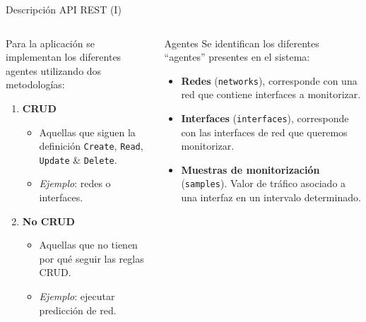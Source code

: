 \documentclass[aspectratio=169,xcolor=dvipsnames]{beamer}
\begin{document}
	\begin{frame}{Descripción API REST (I)}
		\begin{columns}
			\begin{column}{0.5\textwidth}
				Para la aplicación se implementan los diferentes agentes utilizando dos metodologías: \\
				
				\vspace{12px}
				
				\begin{enumerate}
					\item \textbf{CRUD} 
					\begin{itemize}
						\item Aquellas que siguen la definición \texttt{Create}, \texttt{Read}, \texttt{Update} \& \texttt{Delete}.
						
						\item \textit{Ejemplo}: redes o interfaces.
					\end{itemize}
				
					\item \textbf{No CRUD}
					\begin{itemize}
						\item Aquellas que no tienen por qué seguir las reglas CRUD.
						
						\item \textit{Ejemplo}: ejecutar predicción de red.
					\end{itemize}
				\end{enumerate}
			\end{column}
		
			\begin{column}{0.5\textwidth}
				\begin{alertblock}{Agentes}
					Se identifican los diferentes ``agentes'' presentes en el sistema:
					
					\begin{itemize}
						\item \textbf{Redes} (\texttt{networks}), corresponde con una red que contiene interfaces a monitorizar.
						
						\item \textbf{Interfaces} (\texttt{interfaces}), corresponde con las interfaces de red que queremos monitorizar.
						
						\item \textbf{Muestras de monitorización} (\texttt{samples}). Valor de tráfico asociado a una interfaz en un intervalo determinado.
					\end{itemize}
				\end{alertblock}
			\end{column}
		\end{columns}
	\end{frame}
	
\end{document}

